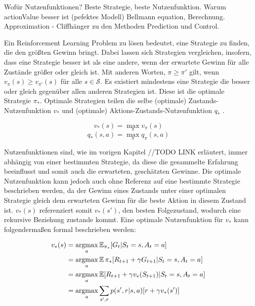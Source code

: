 Wofür Nutzenfunktionen?
Beste Strategie, beste Nutzenfunktion.
Warum actionValue besser ist (pefektes Modell)
Bellmann equation, Berechnung.
Approximation  - Cliffhänger zu den Methoden
Prediction und Control.


Ein Reinforcement Learning Problem zu lösen bedeutet, eine Strategie zu finden, die den größten Gewinn bringt. Dabei lassen sich Strategien vergleichen, insofern, dass eine Strategie besser ist als eine andere, wenn der erwartete Gewinn für alle Zustände größer oder gleich ist. Mit anderen Worten, $\pi \geq \pi'$ gilt, wenn $v_\pi(s) \geq v_{\pi'}(s)$ für alle $s \in \mathcal{S}$. Es existiert mindestens eine Strategie die besser oder gleich gegenüber allen anderen Strategien ist. Diese ist die optimale Strategie $\pi_*$. Optimale Strategien teilen die selbe (optimale) Zustands-Nutzenfunktion $v_*$ und (optimale) Aktions-Zustands-Nutzenfunktion $q_*$ \cite[S.~62f]{Sutton1998}. 

\begin{equation}\label{eq:optimaleValueFunction}
    v_*(s) = \max_\pi v_\pi(s)
\end{equation}
\begin{equation}\label{eq:optimaleActionValueFunction}
    q_*(s,a) = \max_\pi q_\pi(s,a)
\end{equation}

Nutzenfunktionen sind, wie im vorigen Kapitel //TODO LINK erläutert, immer abhängig von einer bestimmten Strategie, da diese die gesammelte Erfahrung beeinflusst und somit auch die erwarteten, geschätzten Gewinne. Die optimale Nutzenfunktion kann jedoch auch ohne Referenz auf eine bestimmte Strategie beschrieben werden, da der Gewinn eines Zustands unter einer optimalen Strategie gleich dem erwarteten Gewinn für die beste Aktion in diesem Zustand ist. $v_*(s)$ referenziert somit $v_*(s')$, den besten Folgezustand, wodurch eine rekursive Beziehung zustande kommt. Eine optimale Nutzenfunktion für $v_*$ kann folgendermaßen formal beschrieben werden:

\begin{equation}\label{eq:bellmanValue}
    \begin{aligned}
        v_*(s) &= \operatorname*{argmax}_a \operatorname{\mathbb{E}}_{\pi_*}[G_t | S_t = s, A_t = a] \\
        &= \operatorname*{argmax}_a \operatorname{\mathbb{E}}{\pi_*}[ R_{t+1} + \gamma G_{t+1} | S_t = s, A_t = a] \\
        &= \operatorname*{argmax}_a \operatorname{\mathbb{E}}[ R_{t+1} + \gamma v_*(S_{t+1}) | S_t = s, A_t = a] \\
        &= \operatorname*{argmax}_a \sum_{s',r}p(s', r | s,a)[r+ \gamma v_*(s')]
    \end{aligned}
\end{equation}

